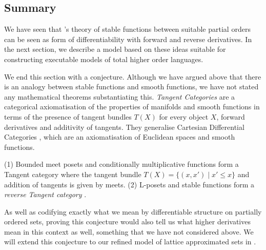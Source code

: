 \subsection{Summary}
\label{sec:diff-stab-summary}

We have seen that \citet{berry79}'s theory of stable functions between suitable partial orders can be seen as form of differentiability with forward and reverse derivatives. In the next section, we describe a model based on these ideas suitable for constructing executable models of total higher order languages.

We end this section with a conjecture. Although we have argued above
that there is an analogy between stable functions and smooth
functions, we have not stated any mathematical theorems substantiating
this. \emph{Tangent Categories} \cite{cockett14,cockett18} are a
categorical axiomatisation of the properties of manifolds and smooth
functions in terms of the presence of tangent bundles $T(X)$ for every
object $X$, forward derivatives and additivity of tangents. They
generalise Cartesian Differential Categories \cite{cdcs}, which are an
axiomatisation of Euclidean spaces and smooth functions.

\begin{conjecture}
  \label{con:tangent-stable-fns}
  (1) Bounded meet posets and conditionally multiplicative functions
  form a Tangent category where the tangent bundle
  $T(X) = \{(x,x') \mid x' \leq x\}$ and addition of tangents is given
  by meets. (2) L-posets and stable functions form a \emph{reverse
    Tangent category} \cite{reverse-tangents}.
\end{conjecture}

As well as codifying exactly what we mean by differentiable structure
on partially ordered sets, proving this conjecture would also tell us
what higher derivatives mean in this context as well, something that
we have not considered above. We will extend this conjecture to our
refined model of lattice approximated sets in .


